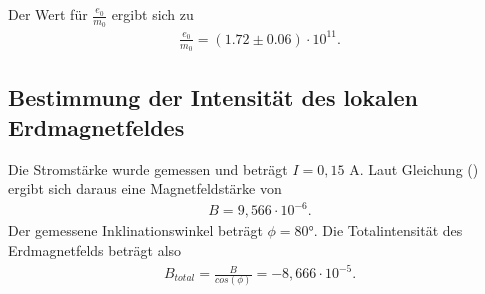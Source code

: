 Der Wert für $\frac{e_0}{m_0}$ ergibt sich zu
\begin{align*}
\frac{e_0}{m_0} = (1.72 \pm 0.06) \cdot 10^{11} .
\end{align*}


\subsection{Bestimmung der Intensität des lokalen Erdmagnetfeldes}
Die Stromstärke wurde gemessen und beträgt $I = 0,15$ \si{\ampere}.
Laut Gleichung () ergibt sich daraus eine Magnetfeldstärke von
\begin{align*}
    B = 9,566 \cdot 10^{-6} .
\end{align*}
Der gemessene Inklinationswinkel beträgt $\phi = 80°$.
Die Totalintensität des Erdmagnetfelds beträgt also
\begin{align*}
    B_{total} = \frac{B}{cos(\phi)} = -8,666 \cdot 10^{-5} .
\end{align*}
